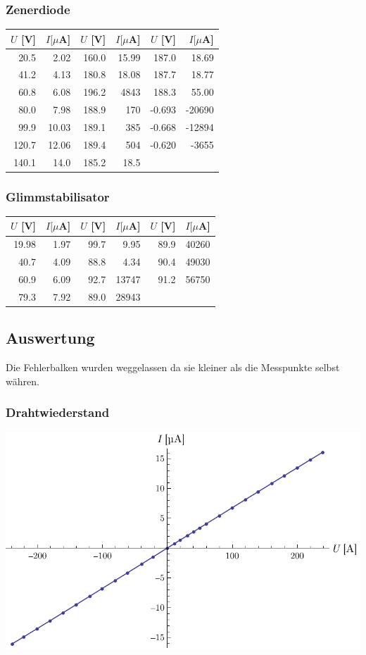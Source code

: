 \documentclass[12pt,a4paper]{article}
\begin{document}
\subsubsection*{Zenerdiode}
\begin{tabular}{|r|r|r|r|r|r|}
\hline
$U$ [V]&$I [\mu $A]&$U$ [V]&$I [\mu $A]&$U$ [V]&$I [\mu $A]\\
\hline
20.5&2.02&160.0&15.99&187.0&18.69\\
41.2&4.13&180.8&18.08&187.7&18.77\\
60.8&6.08&196.2&4843&188.3&55.00\\
80.0&7.98&188.9&170&-0.693&-20690\\
99.9&10.03&189.1&385&-0.668&-12894\\
120.7&12.06&189.4&504&-0.620&-3655\\
140.1&14.0&185.2&18.5&&\\
\hline
\end{tabular}

\subsubsection*{Glimmstabilisator}
\begin{tabular}{|r|r|r|r|r|r|}
\hline
$U$ [V]&$I [\mu $A]&$U$ [V]&$I [\mu $A]&$U$ [V]&$I [\mu $A]\\
\hline
19.98&1.97&99.7&9.95&89.9&40260\\
40.7&4.09&88.8&4.34&90.4&49030\\
60.9&6.09&92.7&13747&91.2&56750\\
79.3&7.92&89.0&28943&&\\
\hline
\end{tabular}

\subsection*{Auswertung}
Die Fehlerbalken wurden weggelassen da sie kleiner als die Messpunkte selbst währen.

\subsubsection*{Drahtwiederstand}
\includegraphics[width=15cm]{draht.pdf}
\end{document}
